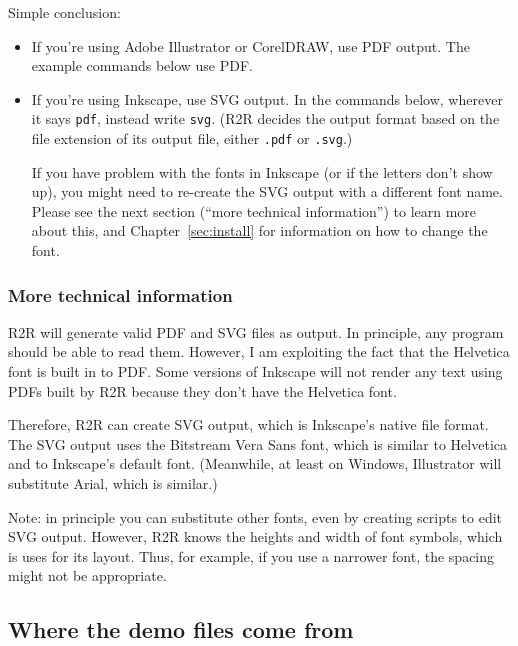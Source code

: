 \documentclass[letterpaper,12pt]{report}
\begin{document}
Simple conclusion:
\begin{itemize}
\item If you're using Adobe Illustrator or CorelDRAW, use PDF output.  The example commands below use PDF.
\item If you're using Inkscape, use SVG output.  In the commands below, wherever it says {\tt pdf},
instead write {\tt svg}.
(R2R decides the output format based on the file extension
of its output file, either {\tt .pdf} or {\tt .svg}.)

If you have problem with the fonts in Inkscape (or if the letters don't show up), you might need to re-create the SVG output with a different font name.  Please see the next section (``more technical information'') to learn more about this, and Chapter~\ref{sec:install} for information on how to change the font.
\end{itemize}

\subsubsection{More technical information}

R2R will generate valid PDF and SVG files as output. In principle, any program should be able to read them.
However, I am exploiting the fact that the Helvetica font is built in to PDF.  Some versions of Inkscape
will not render any text using PDFs built by R2R because they don't have the Helvetica font.

Therefore, R2R can create SVG output, which is Inkscape's native file format.
The SVG output uses the Bitstream Vera Sans font, which is similar to Helvetica and to Inkscape's default font.  (Meanwhile, at least
on Windows, Illustrator will substitute Arial, which is similar.)

Note: in principle you can substitute other fonts, even by creating scripts to edit SVG output.
However, R2R knows the heights and width of font symbols, which is uses for its layout.  Thus, for example, if you use a narrower font, the spacing might not be appropriate.

\subsection{Where the demo files come from}
\end{document}
